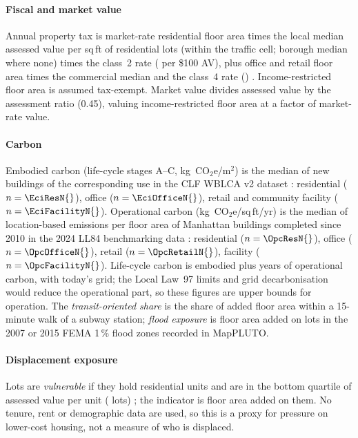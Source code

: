 \documentclass[preprint,12pt]{elsarticle}
\newcommand{\cotwo}{CO$_2$e}
\begin{document}
\paragraph{Fiscal and market value} Annual property tax is market-rate residential floor area times the local median assessed value per sq\,ft of residential lots (within the traffic cell; borough median where none) times the class~2 rate (\TaxRateTwo{} per \$100 AV), plus office and retail floor area times the commercial median and the class~4 rate (\TaxRateFour{}) \cite{nyc_dof2026}. Income-restricted floor area is assumed tax-exempt. Market value divides assessed value by the assessment ratio (0.45), valuing income-restricted floor area at a factor \AffValueFactor{} of market-rate value.

\paragraph{Carbon} Embodied carbon (life-cycle stages A--C, kg~\cotwo{}/m$^2$) is the median of new buildings of the corresponding use in the CLF WBLCA v2 dataset \cite{benke2025harmonized,clf_wblca_data}: residential \EciRes{} ($n=\EciResN{}$), office \EciOffice{} ($n=\EciOfficeN{}$), retail \EciRetail{} and community facility \EciFacility{} ($n=\EciFacilityN{}$). Operational carbon (kg~\cotwo{}/sq\,ft/yr) is the median of location-based emissions per floor area of Manhattan buildings completed since 2010 in the 2024 LL84 benchmarking data \cite{nyc_ll84}: residential \OpcRes{} ($n=\OpcResN{}$), office \OpcOffice{} ($n=\OpcOfficeN{}$), retail \OpcRetail{} ($n=\OpcRetailN{}$), facility \OpcFacility{} ($n=\OpcFacilityN{}$). Life-cycle carbon is embodied plus \LifecycleYears{} years of operational carbon, with today's grid; the Local Law~97 limits \cite{nyc_ll97} and grid decarbonisation would reduce the operational part, so these figures are upper bounds for operation. The \emph{transit-oriented share} is the share of added floor area within a 15-minute walk of a subway station; \emph{flood exposure} is floor area added on lots in the 2007 or 2015 FEMA 1\,\% flood zones recorded in MapPLUTO.

\paragraph{Displacement exposure} Lots are \emph{vulnerable} if they hold residential units and are in the bottom quartile of assessed value per unit (\NVulnerable{} lots) \cite{chapple2016forewarned,bartik2023costs}; the indicator is floor area added on them. No tenure, rent or demographic data are used, so this is a proxy for pressure on lower-cost housing, not a measure of who is displaced.
\end{document}
